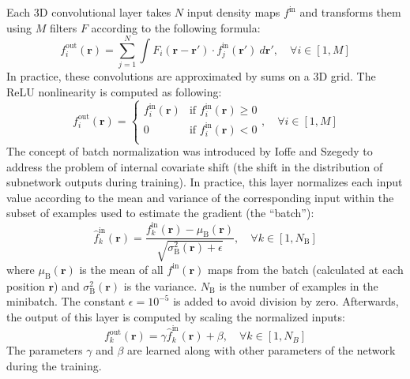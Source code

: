 \documentclass{bioinfo}
\begin{document}
Each 3D convolutional layer takes $N$ input density maps $f^\text{in}$
and transforms them using $M$ filters $F$ according to the following
formula:
\begin{equation}
f^\text{out}_i (\mathbf{r}) = \sum^{N}_{j=1} \int F_i (\mathbf{r} - \mathbf{r'}) \cdot f^\text{in}_j(\mathbf{r'}) ~d\mathbf{r'}, \quad\forall i \in [1,M]
\end{equation}
In practice, these convolutions are approximated by sums on a 3D grid.
The ReLU nonlinearity is computed as following:
\begin{equation}
f^\text{out}_i (\mathbf{r}) = \begin{cases}
               f^\text{in}_i(\mathbf{r}) &\text{if } f^\text{in}_i(\mathbf{r})\geq 0\\
               0                         &\text{if } f^\text{in}_i(\mathbf{r})<0\\
            \end{cases}, \quad\forall i \in [1,M]
\end{equation}
The concept of batch normalization was introduced by Ioffe and
Szegedy \citep{ioffe2015batch} to address the problem of internal
covariate shift (the shift in the distribution of subnetwork outputs
during training). In practice, this layer normalizes each input value
according to the mean and variance of the corresponding input within
the subset of examples used to estimate the gradient (the ``batch''):
\begin{equation}
\hat{f}^\text{in}_k(\mathbf{r}) = \frac{f^\text{in}_k(\mathbf{r}) - \mu_\text{B}(\mathbf{r})}{\sqrt{\sigma^{2}_\text{B}(\mathbf{r}) + \epsilon}}, \quad\forall k \in [1,N_\text{B}]
\end{equation}
where $\mu_\text{B}(\mathbf{r})$ is the mean of all
$f^\text{in}(\mathbf{r})$ maps from the batch (calculated at each
position $\mathbf{r}$) and $\sigma^{2}_\text{B}(\mathbf{r})$ is the
variance.
$N_\text{B}$ is the number of examples in the minibatch. The constant
$\epsilon = 10^{-5}$ is added to avoid division by zero. Afterwards,
the output of this layer is computed by scaling the normalized inputs:
\begin{equation}
f^\text{out}_k(\mathbf{r}) = \gamma \hat{f}^\text{in}_k(\mathbf{r}) + \beta, \quad\forall k \in [1,N_B]
\end{equation}
The parameters $\gamma$ and $\beta$ are learned along with other
parameters of the network during the training.
\end{document}
